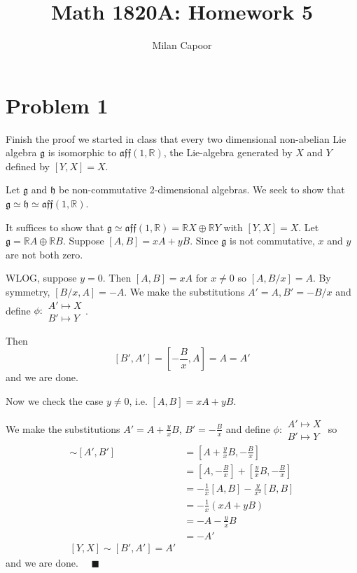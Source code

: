 \documentclass[12pt]{article}
\title{Math 1820A: Homework 5}
\author{Milan Capoor}
\date{}
\newcommand{\R}{\mathbb{R}}
\newcommand{\qed}{\quad \blacksquare}
\newcommand{\g}{\mathfrak{g}}
\newcommand{\h}{\mathfrak{h}}
\begin{document}
\maketitle

\section*{Problem 1}
Finish the proof we started in class that every two dimensional non-abelian Lie algebra $\g$ is isomorphic to $\mathfrak{aff}(1,\R)$, the Lie-algebra generated by $X$ and $Y$ defined by $[Y,X] = X$.

    \color{blue}
        Let $\g$ and $\h$ be non-commutative 2-dimensional algebras. We seek to show that $\g \simeq \h \simeq \mathfrak{aff}(1,\R)$. 

        It suffices to show that $\g \simeq \mathfrak{aff}(1,\R) = \R X \oplus \R Y$ with $[Y, X] = X$. Let $\g = \R A \oplus \R B$. Suppose $[A, B] = xA + yB$. Since $\g$ is not commutative, $x$ and $y$ are not both zero. 

        \color{blue}
        WLOG, suppose $y = 0$. Then $[A, B] = xA$ for $x \neq 0$ so $[A, B/x] = A$. By symmetry, $[B/x, A] = -A$. 
        We make the substitutions $A' = A, B' = -B/x$ and define $\phi: \begin{array}{c}
            A' \mapsto X \\
            B' \mapsto Y
        \end{array}$. 

        Then 
        \[[B', A'] = [-\frac{B}{x}, A] = A = A'\]
        and we are done. 

        Now we check the case $y \neq 0$, i.e. $[A, B] = xA + yB$.

        We make the substitutions $A' = A + \frac{y}{x}B$, $B' = -\frac{B}{x}$ and define $\phi: \begin{array}{c}
            A' \mapsto X\\ 
            B' \mapsto Y
        \end{array}$ 
        so 
        \begin{align*}
            [X, Y] \sim [A', B'] &= [A + \frac{y}{x}B, -\frac{B}{x}]\\
                &= [A, -\frac{B}{x}] + [\frac{y}{x}B, -\frac{B}{x}]\\
                &= -\frac{1}{x}[A, B] - \frac{y}{x^2}[B, B]\\ 
                &= -\frac{1}{x}(xA + yB)\\
                &= -A - \frac{y}{x}B\\ 
                &= -A'\\
            [Y, X] \sim [B', A'] = A'
        \end{align*}
        and we are done. $\qed$
\end{document}
